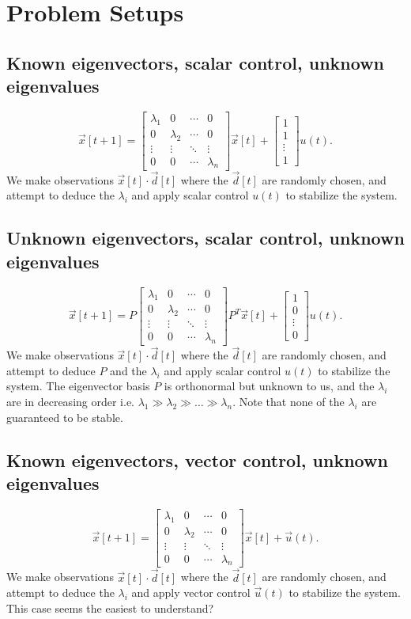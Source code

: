 \documentclass[letterpaper]{article}
\theoremstyle{remark}
\newcommand{\mat}[1]{\ensuremath{\begin{bmatrix}#1\end{bmatrix}}}
\begin{document}
\section*{Problem Setups}
\subsection*{Known eigenvectors, scalar control, unknown eigenvalues}
\[
    \vec{x}[t + 1] = \mat{\lambda_1 & 0 & \cdots & 0 \\ 0 & \lambda_2 & \cdots & 0 \\ \vdots  & \vdots & \ddots & \vdots \\ 0 & 0 & \cdots & \lambda_n} \vec{x}[t] + \mat{1 \\ 1 \\ \vdots \\ 1}u(t).
\]
We make observations $\vec{x}[t] \cdot \vec{d}[t]$ where the $\vec{d}[t]$ are randomly chosen, and attempt to deduce the $\lambda_i$ and apply scalar control $u(t)$ to stabilize the system.

\subsection*{Unknown eigenvectors, scalar control, unknown eigenvalues}
\[
    \vec{x}[t + 1] = P\mat{\lambda_1 & 0 & \cdots & 0 \\ 0 & \lambda_2 & \cdots & 0 \\ \vdots  & \vdots & \ddots & \vdots \\ 0 & 0 & \cdots & \lambda_n}P^T \vec{x}[t] + \mat{1 \\ 0 \\ \vdots \\ 0}u(t).
\]
We make observations $\vec{x}[t] \cdot \vec{d}[t]$ where the $\vec{d}[t]$ are randomly chosen, and attempt to deduce $P$ and the $\lambda_i$ and apply scalar control $u(t)$ to stabilize the system. The eigenvector basis $P$ is orthonormal but unknown to us, and the $\lambda_i$ are in decreasing order i.e. $\lambda_1 \gg \lambda_2 \gg \ldots \gg \lambda_n$. Note that none of the $\lambda_i$ are guaranteed to be stable.

\subsection*{Known eigenvectors, vector control, unknown eigenvalues}
\[
    \vec{x}[t + 1] = \mat{\lambda_1 & 0 & \cdots & 0 \\ 0 & \lambda_2 & \cdots & 0 \\ \vdots  & \vdots & \ddots & \vdots \\ 0 & 0 & \cdots & \lambda_n} \vec{x}[t] + \vec{u}(t).
\]
We make observations $\vec{x}[t] \cdot \vec{d}[t]$ where the $\vec{d}[t]$ are randomly chosen, and attempt to deduce the $\lambda_i$ and apply vector control $\vec{u}(t)$ to stabilize the system. This case seems the easiest to understand?
\end{document}

